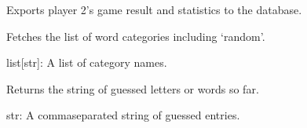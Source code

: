 \documentclass[letterpaper,10pt,english]{sphinxmanual}
\begin{document}

\begin{fulllineitems}
\label{\detokenize{modules:Game_Logic.export_player2}}
\pysigstartsignatures
{}
\pysigstopsignatures
\sphinxAtStartPar
Exports player 2’s game result and statistics to the database.

\end{fulllineitems}


\begin{fulllineitems}
\label{\detokenize{modules:Game_Logic.get_categories}}
\pysigstartsignatures
{}
\pysigstopsignatures
\sphinxAtStartPar
Fetches the list of word categories including ‘random’.
\begin{description}
\sphinxAtStartPar
list{[}str{]}: A list of category names.

\end{description}

\end{fulllineitems}


\begin{fulllineitems}
\label{\detokenize{modules:Game_Logic.get_guessed_words}}
\pysigstartsignatures
{}
\pysigstopsignatures
\sphinxAtStartPar
Returns the string of guessed letters or words so far.
\begin{description}
\sphinxAtStartPar
str: A comma\sphinxhyphen{}separated string of guessed entries.

\end{description}

\end{fulllineitems}

\end{document}
